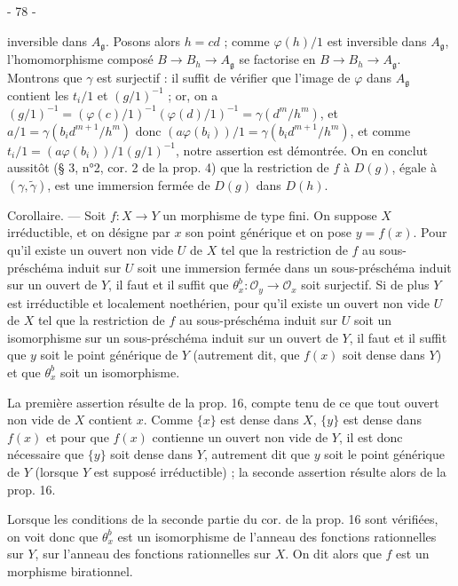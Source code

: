\newpage


- 78 -

inversible dans $A_{\mathfrak{g}}$. Posons alors $h=cd$ ; comme $\varphi(h)/1$ est inversible dans $A_{\mathfrak{g}}$, l'homomorphisme composé $B \to B_h \to A_{\mathfrak{g}}$ se factorise en $B \to B_h \to A_{\mathfrak{g}}$. Montrons que $\gamma$ est surjectif : il suffit de vérifier que l'image de $\varphi$ dans $A_{\mathfrak{g}}$ contient les $t_i/1$ et $(g/1)^{-1}$ ; or, on a $(g/1)^{-1} = (\varphi(c)/1)^{-1} (\varphi(d)/1)^{-1} = \gamma(d^m/h^m)$, et $a/1 = \gamma(b_i d^{m+1}/h^m)$ donc $(a\varphi(b_i))/1 = \gamma(b_i d^{m+1}/h^m)$, et comme $t_i/1 = (a\varphi(b_i))/1 (g/1)^{-1}$, notre assertion est démontrée. On en conclut aussitôt (§ 3, n°2, cor. 2 de la prop. 4) que la restriction de $f$ à $D(g)$, égale à $(\gamma, \tilde{\gamma})$, est une immersion fermée de $D(g)$ dans $D(h)$.

Corollaire. — Soit $f : X \to Y$ un morphisme de type fini. On suppose $X$ irréductible, et on désigne par $x$ son point générique et on pose $y=f(x)$. Pour qu'il existe un ouvert non vide $U$ de $X$ tel que la restriction de $f$ au sous-préschéma induit sur $U$ soit une immersion fermée dans un sous-préschéma induit sur un ouvert de $Y$, il faut et il suffit que $\theta_x^b : \mathcal{O}_y \to \mathcal{O}_x$ soit surjectif. Si de plus $Y$ est irréductible et localement noethérien, pour qu'il existe un ouvert non vide $U$ de $X$ tel que la restriction de $f$ au sous-préschéma induit sur $U$ soit un isomorphisme sur un sous-préschéma induit sur un ouvert de $Y$, il faut et il suffit que $y$ soit le point générique de $Y$ (autrement dit, que $f(x)$ soit dense dans $Y$) et que $\theta_x^b$ soit un isomorphisme.

La première assertion résulte de la prop. 16, compte tenu de ce que tout ouvert non vide de $X$ contient $x$. Comme $\{x\}$ est dense dans $X$, $\{y\}$ est dense dans $f(x)$ et pour que $f(x)$ contienne un ouvert non vide de $Y$, il est donc nécessaire que $\{y\}$ soit dense dans $Y$, autrement dit que $y$ soit le point générique de $Y$ (lorsque $Y$ est supposé irréductible) ; la seconde assertion résulte alors de la prop. 16.

Lorsque les conditions de la seconde partie du cor. de la prop. 16 sont vérifiées, on voit donc que $\theta_x^b$ est un isomorphisme de l'anneau des fonctions rationnelles sur $Y$, sur l'anneau des fonctions rationnelles sur $X$. On dit alors que $f$ est un morphisme birationnel.

